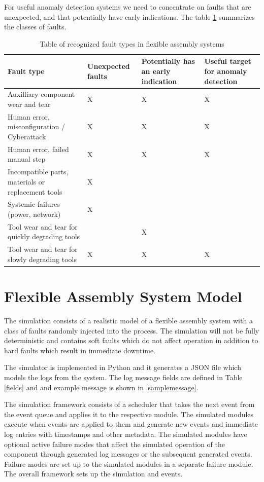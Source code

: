 \documentclass[journal]{IEEEtran}
\begin{document}
For useful anomaly detection systems we need to concentrate on faults that are unexpected, and that potentially have early indications.
The table \ref{faults} summarizes the classes of faults.

\begin{table}[!t]
\renewcommand{\arraystretch}{1.3}
\caption{Table of recognized fault types in flexible assembly systems}
\label{faults}
\centering
\begin{tabular}{|p{25mm}|p{15mm}|p{15mm}|p{15mm}|}
\hline
Fault type & Unexpected faults & Potentially has an early indication & Useful target for anomaly detection \\
\hline
\hline
Auxilliary component wear and tear & X & X & X \\
\hline
Human error, misconfiguration / Cyberattack & X & X & X \\
\hline
Human error, failed manual step & X & X & X \\
\hline
Incompatible parts, materials or replacement tools & X & & \\
\hline
Systemic failures (power, network) & X & & \\
\hline
Tool wear and tear for quickly degrading tools & & X & \\
\hline
Tool wear and tear for slowly degrading tools & X & X & X \\
\hline
\end{tabular}
\end{table}

\section{Flexible Assembly System Model}

The simulation consists of a realistic model of a flexible assembly system with a class of faults randomly injected into the process.
The simulation will not be fully deterministic and contains soft faults which do not affect operation in addition to hard faults which result in immediate downtime.

The simulator is implemented in Python and it generates a JSON file which models the logs from the system. The log message fields are defined in Table \ref{fields} and
and example message is shown in \ref{samplemessage}.

The simulation framework consists of a scheduler that takes the next event from the event queue and applies it to the respective module. The simulated modules
execute when events are applied to them and generate new events and immediate log entries with timestamps and other metadata.
The simulated modules have optional active failure modes that affect the simulated operation of the component through
generated log messages or the subsequent generated events. Failure modes are set up to the simulated modules in a separate failure module.
The overall framework sets up the simulation and events.
\end{document}
